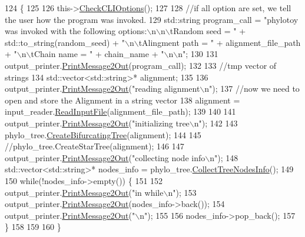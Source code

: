 \begin{DoxyCode}
124                      \{
125   
126   this->\hyperlink{classController_a1307438a1590b0deff238e4ee46aaed3}{CheckCLIOptions}();
127   
128   \textcolor{comment}{//if all option are set, we tell the user how the program was invoked.}
129   std::string program\_call = \textcolor{stringliteral}{"phylotoy was invoked with the following options:\(\backslash\)n\(\backslash\)n\(\backslash\)tRandom seed = "} + 
      std::to\_string(random\_seed) + \textcolor{stringliteral}{"\(\backslash\)n\(\backslash\)tAlingment path = "} + alignment\_file\_path + \textcolor{stringliteral}{"\(\backslash\)n\(\backslash\)tChain name = "} + chain\_name + \textcolor{stringliteral}{
      "\(\backslash\)n\(\backslash\)n"};
130   
131   output\_printer.\hyperlink{classOutputPrinter_ae9cd642df56fb6febef4cccff7ca12f2}{PrintMessage2Out}(program\_call);  
132   
133   \textcolor{comment}{//tmp vector of strings}
134   std::vector<std::string>* alignment;
135   
136   output\_printer.\hyperlink{classOutputPrinter_ae9cd642df56fb6febef4cccff7ca12f2}{PrintMessage2Out}(\textcolor{stringliteral}{"reading alignment\(\backslash\)n"});
137   \textcolor{comment}{//now we need to open and store the Alignment in a string vector}
138   alignment = input\_reader.\hyperlink{classInputReader_ad16dc3ebc228f45257b9ad4c3f62ed14}{ReadInputFile}(alignment\_file\_path);
139   
140   
141   output\_printer.\hyperlink{classOutputPrinter_ae9cd642df56fb6febef4cccff7ca12f2}{PrintMessage2Out}(\textcolor{stringliteral}{"initializing tree\(\backslash\)n"});
142   
143   phylo\_tree.\hyperlink{classTree_ac456dedd5e42bb0fea807aeb526e5a93}{CreateBifurcatingTree}(alignment);
144   
145   \textcolor{comment}{//phylo\_tree.CreateStarTree(alignment);}
146   
147   output\_printer.\hyperlink{classOutputPrinter_ae9cd642df56fb6febef4cccff7ca12f2}{PrintMessage2Out}(\textcolor{stringliteral}{"collecting node info\(\backslash\)n"});
148   std::vector<std::string>* nodes\_info = phylo\_tree.\hyperlink{classTree_a369b39fd2a571e0c4dfdadbdf4364c07}{CollectTreeNodesInfo}();
149   
150   \textcolor{keywordflow}{while}(!nodes\_info->empty()) \{
151     
152     output\_printer.\hyperlink{classOutputPrinter_ae9cd642df56fb6febef4cccff7ca12f2}{PrintMessage2Out}(\textcolor{stringliteral}{"in while\(\backslash\)n"});
153     output\_printer.\hyperlink{classOutputPrinter_ae9cd642df56fb6febef4cccff7ca12f2}{PrintMessage2Out}(nodes\_info->back());
154     output\_printer.\hyperlink{classOutputPrinter_ae9cd642df56fb6febef4cccff7ca12f2}{PrintMessage2Out}(\textcolor{stringliteral}{"\(\backslash\)n"});
155     
156     nodes\_info->pop\_back();
157   \}
158   
159   
160 \}
\end{DoxyCode}
\mbox{\label{classController_a67b2357dbc00faba0f6557f3660e8711}} 

